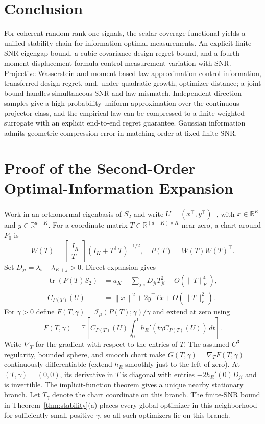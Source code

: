 \documentclass[lettersize,onecolumn]{IEEEtran}
\theoremstyle{remark}
\theoremstyle{definition}
\newcommand{\R}{\mathbb R}
\newcommand{\EE}{\mathbb E}
\newcommand{\tr}{\operatorname{tr}}
\newcommand{\norm}[1]{\left\lVert #1\right\rVert}
\newcommand{\I}{\mathcal I}
\begin{document}
\section{Conclusion}
For coherent random rank-one signals, the scalar coverage functional yields a unified stability chain for information-optimal measurements. An explicit finite-SNR eigengap bound, a cubic covariance-design regret bound, and a fourth-moment displacement formula control measurement variation with SNR. Projective-Wasserstein and moment-based law approximation control information, transferred-design regret, and, under quadratic growth, optimizer distance; a joint bound handles simultaneous SNR and law mismatch. Independent direction samples give a high-probability uniform approximation over the continuous projector class, and the empirical law can be compressed to a finite weighted surrogate with an explicit end-to-end regret guarantee. Gaussian information admits geometric compression error in matching order at fixed finite SNR.

\appendices
\section{Proof of the Second-Order Optimal-Information Expansion}\label{app:subspace}
Work in an orthonormal eigenbasis of $S_2$ and write $U=(x^{\top},y^{\top})^{\top}$, with $x\in\R^K$ and $y\in\R^{d-K}$. For a coordinate matrix $T\in\R^{(d-K)\times K}$ near zero, a chart around $P_0$ is
\begin{equation}
W(T)=\begin{bmatrix}I_K\\T\end{bmatrix}(I_K+T^{\top}T)^{-1/2},\quad
P(T)=W(T)W(T)^{\top}.
\end{equation}
Set $D_{ji}=\lambda_i-\lambda_{K+j}>0$. Direct expansion gives
\begin{align}
\tr(P(T)S_2)&=a_K-\sum_{j,i}D_{ji}T_{ji}^2+O(\lVert T\rVert_F^4),\\
C_{P(T)}(U)&=\norm x^2+2y^{\top}Tx+O(\lVert T\rVert_F^2).
\end{align}
For $\gamma>0$ define $F(T,\gamma)=\I_\mu(P(T);\gamma)/\gamma$ and extend at zero using
\begin{equation}
F(T,\gamma)=\EE\!\left[C_{P(T)}(U)\int_0^1h_R'(t\gamma C_{P(T)}(U))\,dt\right].
\end{equation}
Write $\nabla_T$ for the gradient with respect to the entries of $T$. The assumed $C^3$ regularity, bounded sphere, and smooth chart make $G(T,\gamma)=\nabla_TF(T,\gamma)$ continuously differentiable (extend $h_R$ smoothly just to the left of zero). At $(T,\gamma)=(0,0)$, its derivative in $T$ is diagonal with entries $-2h_R'(0)D_{ji}$ and is invertible. The implicit-function theorem gives a unique nearby stationary branch. Let $T_\gamma$ denote the chart coordinate on this branch. The finite-SNR bound in Theorem~\ref{thm:stability}(a) places every global optimizer in this neighborhood for sufficiently small positive $\gamma$, so all such optimizers lie on this branch.
\end{document}
